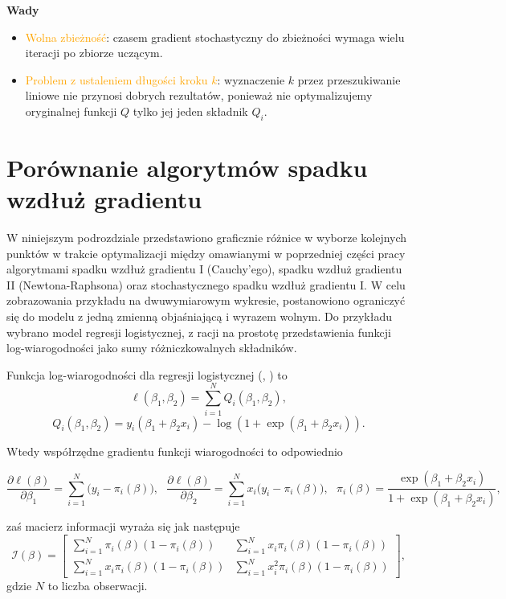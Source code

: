 \textbf{Wady}  \vspace{-5pt}
\begin{itemize}
\item \textcolor{orange}{Wolna zbieżność}: czasem gradient stochastyczny do zbieżności wymaga wielu iteracji po zbiorze uczącym.
\item \textcolor{orange}{Problem z ustaleniem długości kroku $k$}: wyznaczenie $k$
przez przeszukiwanie liniowe nie przynosi dobrych rezultatów,
ponieważ nie optymalizujemy oryginalnej funkcji $Q$ tylko jej jeden
składnik $Q_{i}$.
\end{itemize}
\newpage
\section{Porównanie algorytmów spadku wzdłuż gradientu}

W niniejszym podrozdziale przedstawiono graficznie różnice w wyborze kolejnych punktów w trakcie optymalizacji między omawianymi w poprzedniej części pracy algorytmami spadku wzdłuż gradientu I (Cauchy'ego), spadku wzdłuż gradientu II (Newtona-Raphsona) oraz stochastycznego spadku wzdłuż gradientu I. W celu zobrazowania przykładu na dwuwymiarowym wykresie, postanowiono ograniczyć się do modelu z jedną zmienną objaśniającą i wyrazem wolnym. Do przykładu wybrano model regresji logistycznej, z racji na prostotę przedstawienia funkcji log-wiarogodności jako sumy różniczkowalnych składników.

Funkcja log-wiarogodności dla regresji logistycznej (\cite{czepiel}, \cite{dobson}) to
\begin{equation}\label{logglm}
\ell(\beta_1,\beta_2) = \sum\limits_{i=1}^{N} Q_i(\beta_1,\beta_2), 
\end{equation}
\begin{equation}
Q_i(\beta_1,\beta_2) = y_i(\beta_1+\beta_2x_i) -\log(1+\exp(\beta_1+\beta_2x_i)).
\end{equation}

Wtedy współrzędne gradientu funkcji wiarogodności to odpowiednio

\begin{equation*}
\dfrac{\partial\ell(\beta)}{\partial\beta_1} = \sum\limits_{i=1}^{N}\Big(y_i-\pi_i(\beta)\Big), \ \ \
\dfrac{\partial\ell(\beta)}{\partial\beta_2} = \sum\limits_{i=1}^{N}x_i\Big(y_i-\pi_i(\beta)\Big), \ \ \
\pi_i(\beta) = \frac{\exp(\beta_1+\beta_2x_i)}{1+\exp(\beta_1+\beta_2x_i)},
\end{equation*}

zaś macierz informacji wyraża się jak następuje
\begin{equation}\label{iii}
\mathscr{I}(\beta) = 
\begin{bmatrix}
    \sum\limits_{i=1}^{N}\pi_i(\beta)(1-\pi_i(\beta))       & \sum\limits_{i=1}^{N}x_i\pi_i(\beta)(1-\pi_i(\beta)) \\
\sum\limits_{i=1}^{N}x_i\pi_i(\beta)(1-\pi_i(\beta)) & \sum\limits_{i=1}^{N}x_i^2\pi_i(\beta)(1-\pi_i(\beta)) 
\end{bmatrix},
\end{equation}
gdzie $N$ to liczba obserwacji.

